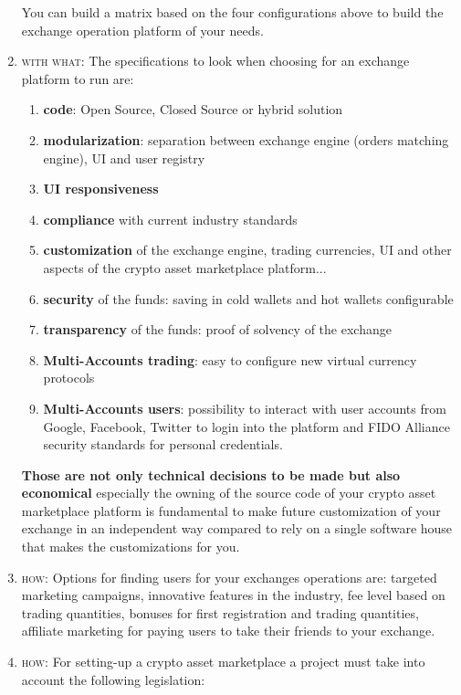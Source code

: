 \documentclass[11pt,fleqn,oneside]{book} %
\begin{document}
\begin{enumerate}
\begin{enumerate}[label*=\arabic*.]
		\end{enumerate}
	You can build a matrix based on the four configurations above to build the exchange operation platform of your needs.
	\item \textsc{with what}: The specifications to look when choosing for an exchange platform to run are:
		\begin{enumerate}[label*=\arabic*.]
			\item \textbf{code}: Open Source, Closed Source or hybrid solution
			\item \textbf{modularization}: separation between exchange engine (orders matching engine), UI and user registry
			\item \textbf{UI responsiveness}
			\item \textbf{compliance} with current industry standards
			\item \textbf{customization} of the exchange engine, trading currencies, UI and other aspects of the crypto asset marketplace platform...
			\item \textbf{security} of the funds: saving in cold wallets and hot wallets configurable
			\item \textbf{transparency} of the funds: proof of solvency of the exchange
			\item \textbf{Multi-Accounts trading}: easy to configure new virtual currency protocols
			\item \textbf{Multi-Accounts users}: possibility to interact with user accounts from Google, Facebook, Twitter 
			to login into the platform and FIDO Alliance security standards for personal credentials.
		\end{enumerate}	
	\textbf{Those are not only technical decisions to be made but also economical} especially the owning of the source code of your crypto asset
	marketplace platform is fundamental to make future customization of your exchange in an independent way compared to rely on a single
	software house that makes the customizations for you.
	\item \textsc{how}: Options for finding users for your exchanges operations are: targeted marketing campaigns, innovative features in the industry,
	fee level based on trading quantities, bonuses for first registration and trading quantities, affiliate marketing for paying users to take their friends
	to your exchange.
	\item \textsc{how}: For setting-up a crypto asset marketplace a project must take into account the following legislation:
		\begin{enumerate}[label*=\arabic*.]

\end{enumerate}
\end{enumerate}
\end{document}
